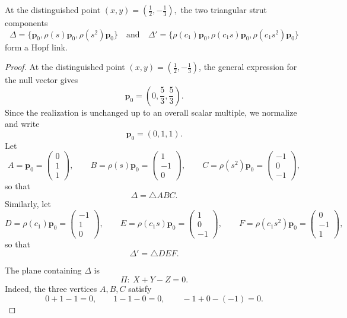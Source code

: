 \documentclass[10pt,a4paper]{amsart}
\begin{document}
\begin{prop}
\label{prop:onehopflink}
At the distinguished point
$
(x,y)=\left(\frac12,-\frac13\right),
$
the two triangular strut components
\[
\Delta=\{{\mathbf p}_0,\rho(s){\mathbf p}_0,\rho(s^2){\mathbf p}_0\}
\quad\text{and}\quad
\Delta'=\{\rho(c_1){\mathbf p}_0,\rho(c_1s){\mathbf p}_0,\rho(c_1s^2){\mathbf p}_0\}
\]
form a Hopf link.
\end{prop}

\begin{proof}
At the distinguished point \((x,y)=\left(\frac12,-\frac13\right)\), the general expression for the null vector gives
\[
{\mathbf p}_0=\left(0,\frac53,\frac53\right).
\]
Since the realization is unchanged up to an overall scalar multiple, we normalize and write
\[
{\mathbf p}_0=(0,1,1).
\]
Let
\[
A={\mathbf p}_0=
\begin{pmatrix}
0\\ 1\\ 1
\end{pmatrix},\qquad
B=\rho(s){\mathbf p}_0=
\begin{pmatrix}
1\\ -1\\ 0
\end{pmatrix},\qquad
C=\rho(s^2){\mathbf p}_0=
\begin{pmatrix}
-1\\ 0\\ -1
\end{pmatrix},
\]
so that
\[
\Delta=\triangle ABC.
\]
Similarly, let
\[
D=\rho(c_1){\mathbf p}_0=
\begin{pmatrix}
-1\\ 1\\ 0
\end{pmatrix},\qquad
E=\rho(c_1s){\mathbf p}_0=
\begin{pmatrix}
1\\ 0\\ -1
\end{pmatrix},\qquad
F=\rho(c_1s^2){\mathbf p}_0=
\begin{pmatrix}
0\\ -1\\ 1
\end{pmatrix},
\]
so that
\[
\Delta'=\triangle DEF.
\]

The plane containing \(\Delta\) is
\[
\Pi:\ X+Y-Z=0.
\]
Indeed, the three vertices \(A,B,C\) satisfy
\[
0+1-1=0,\qquad 1-1-0=0,\qquad -1+0-(-1)=0.
\]


\end{proof}
\end{document}
